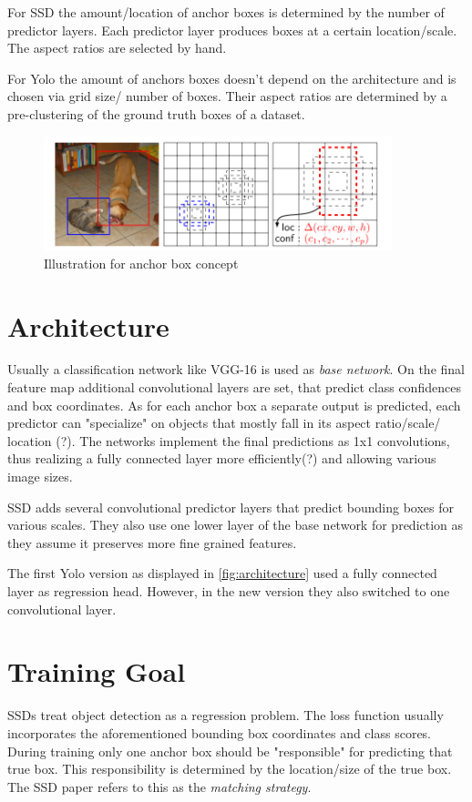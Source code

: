 \documentclass{article}
\begin{document}
For SSD the amount/location of anchor boxes is determined by the number of predictor layers. Each predictor layer produces boxes at a certain location/scale. The aspect ratios are selected by hand. 

For Yolo the amount of anchors boxes doesn't depend on the architecture and is chosen via grid size/ number of boxes. Their aspect ratios are determined by a pre-clustering of the ground truth boxes of a dataset.
\begin{figure}[h]
	\centering
	\includegraphics[width=0.9\textwidth]{fig/anchors}
	\caption{Illustration for anchor box concept \cite{ssd}}
	\label{fig:anchors}
\end{figure}
\section{Architecture}

Usually a classification network like VGG-16 is used as \textit{base network}. On the final feature map additional convolutional layers are set, that predict class confidences and box coordinates. As for each anchor box a separate output is predicted, each predictor can "specialize" on objects that mostly fall in its aspect ratio/scale/ location (?). The networks implement the final predictions as 1x1 convolutions, thus realizing a fully connected layer more efficiently(?) and allowing various image sizes.

SSD adds several convolutional predictor layers that predict bounding boxes for various scales. They also use one lower layer of the base network for prediction as they assume it preserves more fine grained features.

The first Yolo version as displayed in \autoref{fig:architecture} used a fully connected layer as regression head. However, in the new version they also switched to one convolutional layer.

\section{Training Goal}
SSDs treat object detection as a regression problem. The loss function usually incorporates the aforementioned bounding box coordinates and class scores. During training only one anchor box should be "responsible" for predicting that true box. This responsibility is determined by the location/size of the true box. The SSD paper refers to this as the \textit{matching strategy}.
\end{document}
